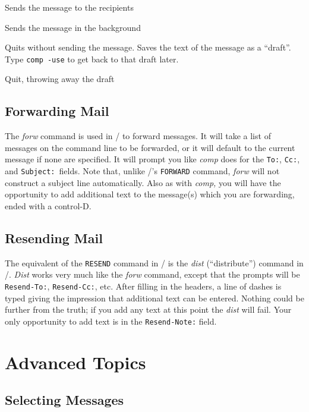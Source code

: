 \titem[\tt send] Sends the message to the recipients

\titem[\tt push] Sends the message in the background

\titem[\tt quit] Quits without sending the message.
				Saves the text of the message as
				a ``draft''. Type \verb|comp -use| to
				get back to that draft later.

 Quit, throwing away the draft
\endgroup

\bigskip

\subsection{Forwarding Mail}

The {\it forw\/} command is used in \MH/ to forward messages.  It will take
a list of messages on the command line to be forwarded, or it will default
to the current message if none are specified.  It will prompt you like {\it
comp\/} does for the {\tt To:}, {\tt Cc:}, and {\tt Subject:}\ fields.  Note
that, unlike \MM/'s {\tt FORWARD} command, {\it forw\/} will not construct a
subject line automatically.  Also as with {\it comp,} you will have the
opportunity to add additional text to the message(s) which you are
forwarding, ended with a control-D.  

\subsection{Resending Mail}

The equivalent of the {\tt RESEND} command in \MM/ is the {\it dist\/}
(``distribute'') command in \MH/.  {\it Dist\/} works very much like the
{\it forw\/} command, except that the prompts will be {\tt Resend-To:},
{\tt Resend-Cc:}, etc. After filling in the headers, a line of dashes
is typed giving the impression that additional text can be entered.
Nothing could be further from the truth; if you add any text at this
point the {\it dist\/} will fail.  Your only opportunity to add text
is in the {\tt Resend-Note:} field.

\section{Advanced Topics}

\subsection{Selecting Messages}

